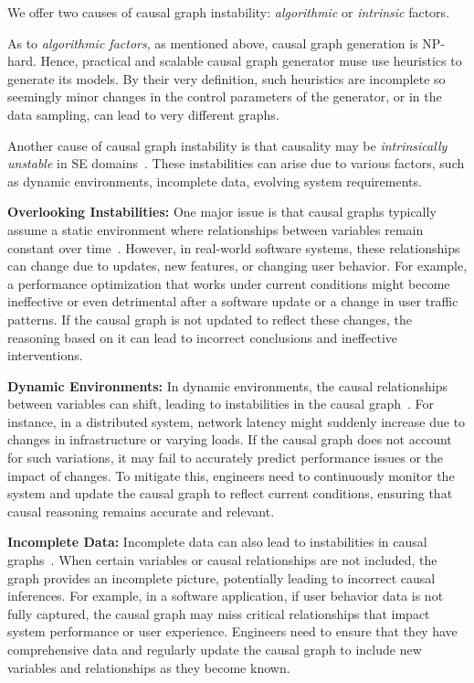 We offer two causes of causal graph instability: {\em algorithmic} or {\em intrinsic} factors.

As to {\em algorithmic factors},  as mentioned above, causal graph generation is NP-hard. Hence,   practical and scalable causal graph generator muse use heuristics to generate its models.
By their very definition, such heuristics are incomplete so seemingly minor changes in the control parameters of the generator, or in the data sampling, can lead to very different graphs.


Another cause of causal graph instability is that causality may be {\em intrinsically unstable} in SE domains~\cite{chindelevitch2012assessing}. 
These instabilities can arise due to various factors, such as dynamic environments, incomplete data,   evolving system requirements.

 \textbf{Overlooking Instabilities:} One major issue is that causal graphs typically assume a static environment where relationships between variables remain constant over time~\cite{10.5555/2074284.2074334}. However, in real-world software systems, these relationships can change due to updates, new features, or changing user behavior. For example, a performance optimization that works under current conditions might become ineffective or even detrimental after a software update or a change in user traffic patterns. If the causal graph is not updated to reflect these changes, the reasoning based on it can lead to incorrect conclusions and ineffective interventions.

   \textbf{Dynamic Environments:} In dynamic environments, the causal relationships between variables can shift, leading to instabilities in the causal graph~\cite{dong2014modeling}. For instance, in a distributed system, network latency might suddenly increase due to changes in infrastructure or varying loads. If the causal graph does not account for such variations, it may fail to accurately predict performance issues or the impact of changes. To mitigate this, engineers need to continuously monitor the system and update the causal graph to reflect current conditions, ensuring that causal reasoning remains accurate and relevant.

 \textbf{Incomplete Data:} Incomplete data can also lead to instabilities in causal graphs~\cite{rohrer2018thinking, 10.5555/2073796.2073813}. When certain variables or causal relationships are not included, the graph provides an incomplete picture, potentially leading to incorrect causal inferences. For example, in a software application, if user behavior data is not fully captured, the causal graph may miss critical relationships that impact system performance or user experience. Engineers need to ensure that they have comprehensive data and regularly update the causal graph to include new variables and relationships as they become known.

